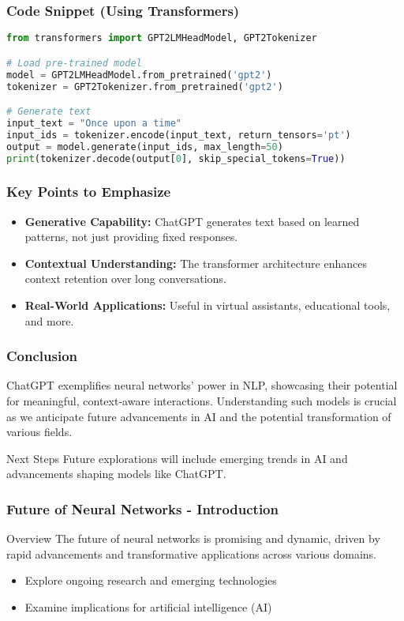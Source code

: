 \documentclass[aspectratio=169]{beamer}
\begin{document}
\begin{frame}[fragile]
    \frametitle{Code Snippet (Using Transformers)}
    \begin{lstlisting}[language=Python]
from transformers import GPT2LMHeadModel, GPT2Tokenizer

# Load pre-trained model
model = GPT2LMHeadModel.from_pretrained('gpt2')
tokenizer = GPT2Tokenizer.from_pretrained('gpt2')

# Generate text
input_text = "Once upon a time"
input_ids = tokenizer.encode(input_text, return_tensors='pt')
output = model.generate(input_ids, max_length=50)
print(tokenizer.decode(output[0], skip_special_tokens=True))
    \end{lstlisting}
\end{frame}

\begin{frame}[fragile]
    \frametitle{Key Points to Emphasize}
    \begin{itemize}
        \item \textbf{Generative Capability:} ChatGPT generates text based on learned patterns, not just providing fixed responses.
        \item \textbf{Contextual Understanding:} The transformer architecture enhances context retention over long conversations.
        \item \textbf{Real-World Applications:} Useful in virtual assistants, educational tools, and more.
    \end{itemize}
\end{frame}

\begin{frame}[fragile]
    \frametitle{Conclusion}
    ChatGPT exemplifies neural networks' power in NLP, showcasing their potential for meaningful, context-aware interactions. Understanding such models is crucial as we anticipate future advancements in AI and the potential transformation of various fields.
    
    \begin{block}{Next Steps}
        Future explorations will include emerging trends in AI and advancements shaping models like ChatGPT.
    \end{block}
\end{frame}

\begin{frame}[fragile]
    \frametitle{Future of Neural Networks - Introduction}
    \begin{block}{Overview}
        The future of neural networks is promising and dynamic, driven by rapid advancements and transformative applications across various domains.
    \end{block}
    \begin{itemize}
        \item Explore ongoing research and emerging technologies
        \item Examine implications for artificial intelligence (AI)
    \end{itemize}
\end{frame}
\end{document}
